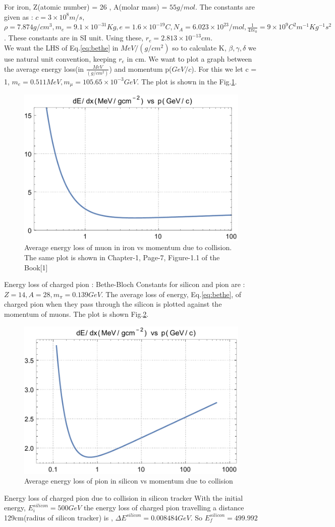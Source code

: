 For iron, Z(atomic number) = 26 , A(molar mass) = $55 g/mol$. The constants are given as : $c=3\times10^8 m/s$, $\rho = 7.874g/cm^3, m_e = 9.1\times 10^{-31} Kg, e = 1.6\times 10^{-19}C, N_A = 6.023\times 10^{23}/mol, \frac{1}{4\pi\epsilon_0}= 9\times 10^9 C^2m^{-1}Kg^{-1}s^2$. These constants are in SI unit. Using these, $r_e = 2.813\times 10^{-13} cm$. \\

We want the LHS of Eq.\eqref{eq:bethe} in $MeV/(g/cm^2)$ so to calculate K, $\beta, \gamma, \delta$ we use natural unit convention, keeping $r_e$ in cm. We want to plot a graph between the average energy loss(in $\frac{MeV}{(g/cm^2)}$) and momentum p($GeV/c$).
For this we let c = 1, $m_e = 0.511 MeV, m_\mu = 105.65\times
10^{-3} GeV.$
The plot is shown in the Fig.\ref{fig:muon}.

\begin{figure}
    \centering
    \includegraphics[width=0.50\linewidth]{Experiment/CMS/Image/Loss/muon_iron.pdf}
    \caption{Average energy loss of muon in iron vs momentum due to collision. The same plot is shown in Chapter-1, Page-7, Figure-1.1 of the Book[1]}
    \label{fig:muon}
\end{figure}

Energy loss of charged pion : Bethe-Bloch
Constants for silicon and pion are : $ Z=14, A =28, m_\pi = 0.139 GeV$. The average loss of energy, Eq.\ref{eq:bethe}, of charged pion when they pass through the silicon is plotted against the momentum of muons. The plot is shown Fig.\ref{fig:silicon}.

\begin{figure}
    \centering
    \includegraphics[width=0.50\linewidth]{Experiment/CMS/Image/Loss/pion_silicon_loss.pdf}
    \caption{Average energy loss of pion in silicon vs momentum due to collision}
    \label{fig:silicon}
\end{figure}
Energy loss of charged pion due to collision in silicon tracker
With the initial energy, $E_i^{silicon} = 500 GeV$ the energy loss of charged pion travelling a distance 129cm(radius of silicon tracker) is , $\Delta E^{silicon} = 0.008484 GeV$. So $E_f^{silicon} = 499.992$

